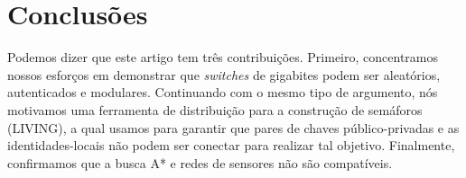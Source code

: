 \documentclass{article}
\begin{document}
\section{Conclusões}
\label{sec:conc}

Podemos dizer que este artigo tem três contribuições. Primeiro, concentramos nossos esforços em demonstrar que \emph{switches} de gigabites podem ser aleatórios, autenticados e modulares. Continuando com o mesmo tipo de argumento, nós motivamos uma ferramenta de distribuição para a construção de semáforos (LIVING), a qual usamos para garantir que pares de chaves público-privadas e as identidades-locais não podem ser conectar para realizar tal objetivo. Finalmente, confirmamos que a busca A* e redes de sensores não são compatíveis.
\end{document}
